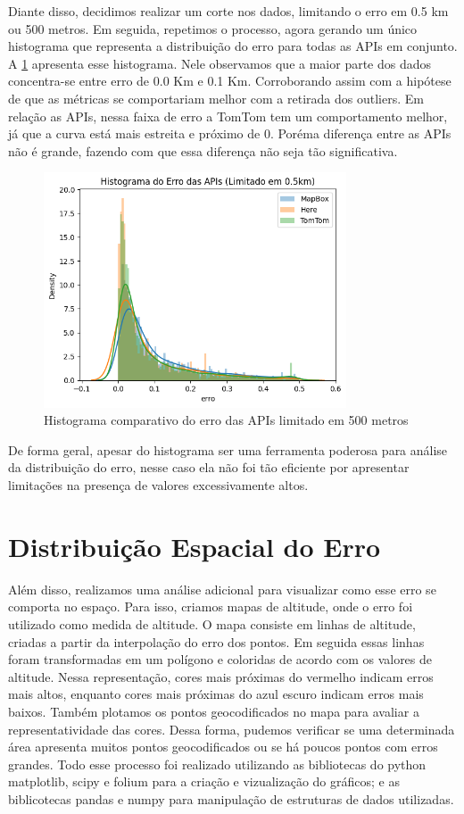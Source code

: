 Diante disso, decidimos realizar um corte nos dados, limitando o erro em 0.5 km ou 500 metros. Em seguida, repetimos o processo, agora gerando um único histograma que representa a distribuição do erro para todas as APIs em conjunto. A \ref{fig:histLimitado} apresenta esse histograma. Nele observamos que a maior parte dos dados concentra-se entre erro de 0.0 Km e 0.1 Km. Corroborando assim com a hipótese de que as métricas se comportariam melhor com a retirada dos outliers. Em relação as APIs, nessa faixa de erro a TomTom tem um comportamento melhor, já que a curva está mais estreita e próximo de 0. Poréma diferença entre as APIs não é grande, fazendo com que essa diferença não seja tão significativa. 
 
\begin{figure}[h]
  \centering
  \includegraphics[width=0.8\textwidth]{Figuras/hist5.png}
  \caption{Histograma comparativo do erro das APIs limitado em 500 metros}
  \label{fig:histLimitado}
\end{figure}

De forma geral, apesar do histograma ser uma ferramenta poderosa para análise da distribuição do erro, nesse caso ela não foi tão eficiente por apresentar limitações na presença de valores excessivamente altos. 

\section{Distribuição Espacial do Erro}
Além disso, realizamos uma análise adicional para visualizar como esse erro se comporta no espaço. Para isso, criamos mapas de altitude, onde o erro foi utilizado como medida de altitude. O mapa consiste em linhas de altitude, criadas a partir da interpolação do erro dos pontos. Em seguida essas linhas foram transformadas em um polígono e coloridas de acordo com os valores de altitude. Nessa representação, cores mais próximas do vermelho indicam erros mais altos, enquanto cores mais próximas do azul escuro indicam erros mais baixos. Também plotamos os pontos geocodificados no mapa para avaliar a representatividade das cores. Dessa forma, pudemos verificar se uma determinada área apresenta muitos pontos geocodificados ou se há poucos pontos com erros grandes. Todo esse processo foi realizado utilizando as bibliotecas do python matplotlib, scipy e folium para a criação e vizualização do gráficos; e as biblicotecas pandas e numpy para manipulação de estruturas de dados utilizadas. 

